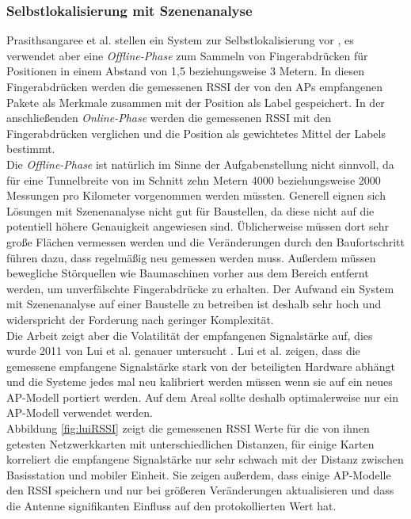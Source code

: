 \subsubsection{Selbstlokalisierung mit Szenenanalyse}
\label{ch:Vorherige:sec:RSS-basierte}
Prasithsangaree et al. stellen ein System zur Selbstlokalisierung vor \cite{prasithsangaree2002indoor}, es verwendet aber eine \emph{Offline-Phase} zum Sammeln von Fingerabdrücken für Positionen in einem Abstand von 1,5 beziehungsweise 3 Metern. 
In diesen Fingerabdrücken werden die gemessenen RSSI der von den APs empfangenen Pakete als Merkmale zusammen mit der Position als Label gespeichert.
In der anschließenden \emph{Online-Phase} werden die gemessenen RSSI mit den Fingerabdrücken verglichen und die Position als gewichtetes Mittel der Labels bestimmt. \\
Die \emph{Offline-Phase} ist natürlich im Sinne der Aufgabenstellung nicht sinnvoll, da für eine Tunnelbreite von im Schnitt zehn Metern 4000 beziehungsweise 2000 Messungen pro Kilometer vorgenommen werden müssten.
Generell eignen sich Lösungen mit Szenenanalyse nicht gut für Baustellen, da diese nicht auf die potentiell höhere Genauigkeit angewiesen sind. 
Üblicherweise müssen dort sehr große Flächen vermessen werden und die Veränderungen durch den Baufortschritt führen dazu, dass regelmäßig neu gemessen werden muss.
Außerdem müssen bewegliche Störquellen wie Baumaschinen vorher aus dem Bereich entfernt werden, um unverfälschte Fingerabdrücke zu erhalten.
Der Aufwand ein System mit Szenenanalyse auf einer Baustelle zu betreiben ist deshalb sehr hoch und widerspricht der Forderung nach geringer Komplexität. \\
Die Arbeit zeigt aber die Volatilität der empfangenen Signalstärke auf, dies wurde 2011 von Lui et al. genauer untersucht \cite{lui2011differences}.
Lui et al. zeigen, dass die gemessene empfangene Signalstärke stark von der beteiligten Hardware abhängt und die Systeme jedes mal neu kalibriert werden müssen wenn sie auf ein neues AP-Modell portiert werden. 
Auf dem Areal sollte deshalb optimalerweise nur ein AP-Modell verwendet werden. \\
Abbildung \ref{fig:luiRSSI} zeigt die gemessenen RSSI Werte für die von ihnen getesten Netzwerkkarten mit unterschiedlichen Distanzen, für einige Karten korreliert die empfangene Signalstärke nur sehr schwach mit der Distanz zwischen Basisstation und mobiler Einheit.
Sie zeigen außerdem, dass einige AP-Modelle den RSSI speichern und nur bei größeren Veränderungen aktualisieren und dass die Antenne signifikanten Einfluss auf den protokollierten Wert hat.

